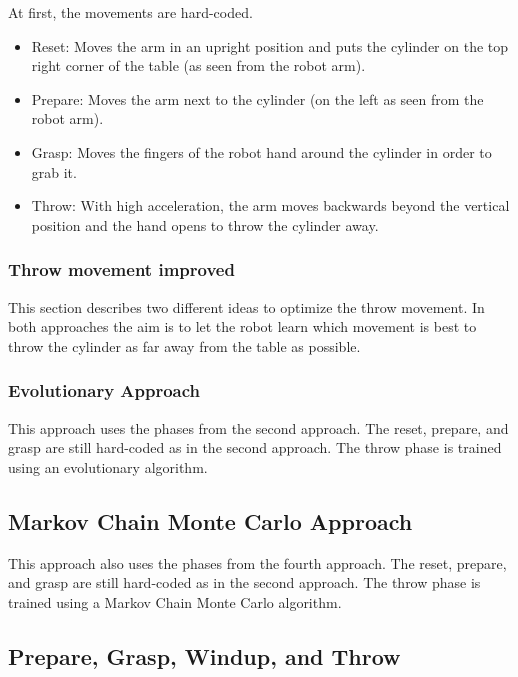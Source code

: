 At first, the movements are hard-coded.

\begin{itemize}
\item Reset: Moves the arm in an upright position and puts the cylinder on the top right corner of the table (as seen from the robot arm).
\item Prepare: Moves the arm next to the cylinder (on the left as seen from the robot arm).
\item Grasp: Moves the fingers of the robot hand around the cylinder in order to grab it.
\item Throw: With high acceleration, the arm moves backwards beyond the vertical position and the hand opens to throw the cylinder away.
\end{itemize}


\subsubsection{Throw movement improved} 

This section describes two different ideas to optimize the throw movement. In both approaches the aim is to let the robot learn which movement is best to throw the cylinder as far away from the table as possible.

\subsubsection{Evolutionary Approach} \label{subsec:EA}

This approach uses the phases from the second approach. The reset, prepare, and grasp are still hard-coded as in the second approach. The throw phase is trained using an evolutionary algorithm. 


\subsection{Markov Chain Monte Carlo Approach} \label{subsec:MCMC}

This approach also uses the phases from the fourth approach. The reset, prepare, and grasp are still hard-coded as in the second approach. The throw phase is trained using a Markov Chain Monte Carlo algorithm. 


\subsection{Prepare, Grasp, Windup, and Throw} \label{sec:Windup}

